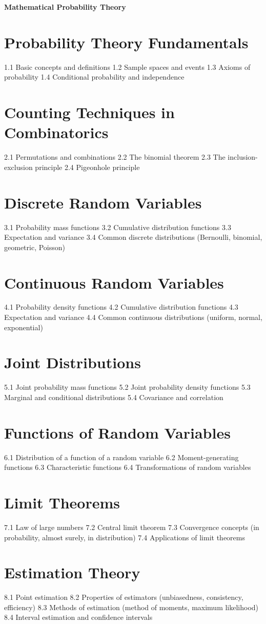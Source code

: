 {\LARGE \bf{Mathematical Probability Theory}}
\section{Probability Theory Fundamentals}
1.1 Basic concepts and definitions
1.2 Sample spaces and events
1.3 Axioms of probability
1.4 Conditional probability and independence
\section{Counting Techniques in Combinatorics}
2.1 Permutations and combinations
2.2 The binomial theorem
2.3 The inclusion-exclusion principle
2.4 Pigeonhole principle
\section{Discrete Random Variables}
3.1 Probability mass functions
3.2 Cumulative distribution functions
3.3 Expectation and variance
3.4 Common discrete distributions (Bernoulli, binomial, geometric, Poisson)
\section{Continuous Random Variables}
4.1 Probability density functions
4.2 Cumulative distribution functions
4.3 Expectation and variance
4.4 Common continuous distributions (uniform, normal, exponential)
\section{Joint Distributions}
5.1 Joint probability mass functions
5.2 Joint probability density functions
5.3 Marginal and conditional distributions
5.4 Covariance and correlation
\section{Functions of Random Variables}
6.1 Distribution of a function of a random variable
6.2 Moment-generating functions
6.3 Characteristic functions
6.4 Transformations of random variables
\section{Limit Theorems}
7.1 Law of large numbers
7.2 Central limit theorem
7.3 Convergence concepts (in probability, almost surely, in distribution)
7.4 Applications of limit theorems
\section{Estimation Theory}
8.1 Point estimation
8.2 Properties of estimators (unbiasedness, consistency, efficiency)
8.3 Methods of estimation (method of moments, maximum likelihood)
8.4 Interval estimation and confidence intervals
